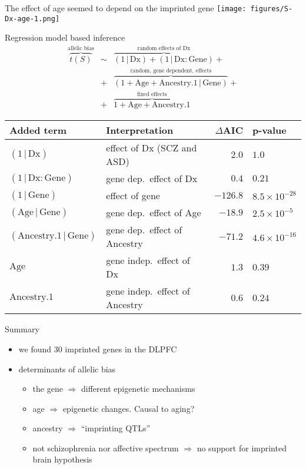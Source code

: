 \documentclass[usenames,dvipsnames]{beamer}
\begin{document}
\begin{frame}{The effect of age seemed to depend on the imprinted gene}
\texttt{[image: figures/S-Dx-age-1.png]}
\end{frame}

\begin{frame}{Regression model based inference}
\footnotesize
\begin{eqnarray*}
\overbrace{t(S)}^{\text{allelic bias}} &\sim& \overbrace{(1 \,|\, \mathrm{Dx}) + (1 \,|\, \mathrm{Dx}:\mathrm{Gene})}^{\text{random effects of Dx}} + \\
&+&  \overbrace{(1 + \mathrm{Age} + \mathrm{Ancestry.1} \,|\, \mathrm{Gene})}^{\text{random, gene dependent, effects}} + \\
&+&  \overbrace{1 + \mathrm{Age} + \mathrm{Ancestry.1}}^{\text{fixed effects}}
\end{eqnarray*}

\vfill

\begin{tabular}{|l|l|rl|}
\hline
Added term & Interpretation                             & \(\Delta\)AIC   & p-value \\
\hline
\((1\,|\,\mathrm{Dx})\) & effect of Dx (SCZ and ASD) & \(2.0\)         & \(1.0\) \\
\((1\,|\,\mathrm{Dx}:\mathrm{Gene})\) & gene dep.~effect of Dx  & \(0.4\)         & \(0.21\) \\
\hline
\((1\,|\,\mathrm{Gene})\) & effect of gene & \(-126.8\)      & \(8.5\times 10^{-28}\) \\
\((\mathrm{Age}\,|\,\mathrm{Gene})\) & gene dep.~effect of Age         & \(-18.9\)       & \(2.5\times 10^{-5}\) \\
\((\mathrm{Ancestry.1}\,|\,\mathrm{Gene})\) & gene dep.~effect of Ancestry & \(-71.2\) & \(4.6\times 10^{-16}\) \\
\hline
\(\mathrm{Age}\) & gene indep.~effect of Dx & \(1.3\) & \(0.39\) \\
\(\mathrm{Ancestry.1}\) & gene indep.~effect of Ancestry & \(0.6\) & \(0.24\) \\
\hline
\end{tabular}
\end{frame}

\begin{frame}{Summary}
\begin{itemize}
\item we found 30 imprinted genes in the DLPFC
\item determinants of allelic bias
	\begin{itemize}
		\item the gene \(\Rightarrow\) different epigenetic mechanisms
		\item age \(\Rightarrow\) epigenetic changes.  Causal to aging?
                \item ancestry \(\Rightarrow\) ``imprinting QTLs''
		\item \alert{not} schizophrenia \alert{nor} affective spectrum
			\(\Rightarrow\) no support for imprinted brain
			hypothesis
	\end{itemize}
\end{itemize}
\end{frame}
\end{document}
